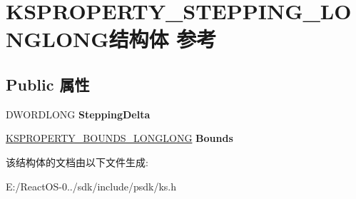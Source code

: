 \hypertarget{struct_k_s_p_r_o_p_e_r_t_y___s_t_e_p_p_i_n_g___l_o_n_g_l_o_n_g}{}\section{K\+S\+P\+R\+O\+P\+E\+R\+T\+Y\+\_\+\+S\+T\+E\+P\+P\+I\+N\+G\+\_\+\+L\+O\+N\+G\+L\+O\+N\+G结构体 参考}
\label{struct_k_s_p_r_o_p_e_r_t_y___s_t_e_p_p_i_n_g___l_o_n_g_l_o_n_g}
\subsection*{Public 属性}
\begin{DoxyCompactItemize}
\item 
\mbox{\label{struct_k_s_p_r_o_p_e_r_t_y___s_t_e_p_p_i_n_g___l_o_n_g_l_o_n_g_a9f5d9e76c5beb4077bc5d78deb5cdcc0}} 
D\+W\+O\+R\+D\+L\+O\+NG {\bfseries Stepping\+Delta}
\item 
\mbox{\label{struct_k_s_p_r_o_p_e_r_t_y___s_t_e_p_p_i_n_g___l_o_n_g_l_o_n_g_acc7cf8a3b634d886249edc1c15a08273}} 
\hyperlink{union_k_s_p_r_o_p_e_r_t_y___b_o_u_n_d_s___l_o_n_g_l_o_n_g}{K\+S\+P\+R\+O\+P\+E\+R\+T\+Y\+\_\+\+B\+O\+U\+N\+D\+S\+\_\+\+L\+O\+N\+G\+L\+O\+NG} {\bfseries Bounds}
\end{DoxyCompactItemize}


该结构体的文档由以下文件生成\+:\begin{DoxyCompactItemize}
\item 
E\+:/\+React\+O\+S-\/0../sdk/include/psdk/ks.\+h\end{DoxyCompactItemize}
